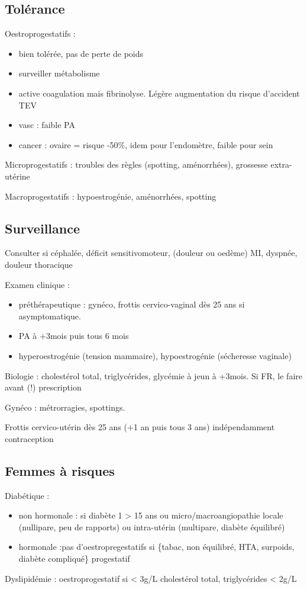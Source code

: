 \documentclass{book}
\begin{document}
\subsection{Tolérance}
\label{sec:org78394a7}
Oestroprogestatifs :
\begin{itemize}
\item bien tolérée, pas de perte de poids
\item surveiller métabolisme
\item active coagulation mais \inc fibrinolyse. Légère augmentation du risque
d'accident TEV
\item vasc : faible \inc PA
\item cancer : ovaire = risque -50\%, idem pour l'endomètre, faible \inc pour sein
\end{itemize}
Microprogestatifs : troubles des règles (spotting, aménorrhées), grossesse
extra-utérine

Macroprogestatifs : hypoestrogénie, aménorrhées, spotting

\subsection{Surveillance}
\label{sec:orgaee4eef}
Consulter si céphalée, déficit sensitivomoteur, (douleur ou oedème) MI, dyspnée,
douleur thoracique

Examen clinique : 
\begin{itemize}
\item préthérapeutique : gynéco, frottis cervico-vaginal dès 25 ans si
asymptomatique.
\item PA à +3mois puis tous 6 mois
\item hyperoestrogénie (tension mammaire), hypoestrogénie (sécheresse vaginale)
\end{itemize}
Biologie : cholestérol total, triglycérides, glycémie à jeun à +3mois. Si FR, le
faire avant (!) prescription

Gynéco : métrorragies, spottings. 

Frottis cervico-utérin dès 25 ans (+1 an puis tous 3 ans) indépendamment contraception

\subsection{Femmes à risques}
\label{sec:org281717f}
Diabétique :
\begin{itemize}
\item non hormonale : si diabète 1 > 15 ans ou micro/macroangiopathie \thus locale
(nullipare, peu de rapports) ou intra-utérin (multipare, diabète équilibré)
\item hormonale :pas d'oestropregestatifs si \{tabac, non équilibré, HTA, surpoids,
diabète compliqué\} \thus progestatif
\end{itemize}
Dyslipidémie : oestroprogestatif si < 3g/L cholestérol total, triglycérides <
2g/L
\end{document}
